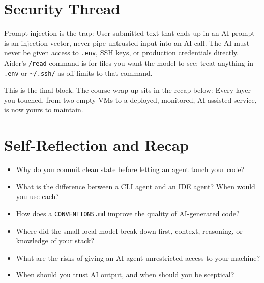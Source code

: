 \newpage
\section{Security Thread}

Prompt injection is the trap: User-submitted text that ends up in an AI
prompt is an injection vector, never pipe untrusted input into an AI call. The AI must never be
given access to \texttt{.env}, SSH keys, or production credentials directly. Aider's
\texttt{/read} command is for files you want the model to see; treat anything in \texttt{.env} or
\texttt{\textasciitilde/.ssh/} as off-limits to that command.

 This is the final block. The course wrap-up sits in the
recap below: Every layer you touched, from two empty VMs to a deployed, monitored, AI-assisted
service, is now yours to maintain.


\section{Self-Reflection and Recap}

\begin{itemize}
    \item Why do you commit clean state before letting an agent touch your code?
    \item What is the difference between a CLI agent and an IDE agent? When would you use each?
    \item How does a \texttt{CONVENTIONS.md} improve the quality of AI-generated code?
    \item Where did the small local model break down first, context, reasoning, or knowledge of
    your stack?
    \item What are the risks of giving an AI agent unrestricted access to your machine?
    \item When should you trust AI output, and when should you be sceptical?
\end{itemize}

